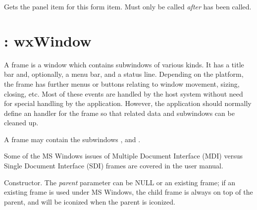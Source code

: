 \label{wxformitemgetitem}


Gets the panel item for this form item. Must only be called {\it after}\rtfsp
{} has been called.

\section{: wxWindow}\label{wxframe}

A frame is a window which contains subwindows of various kinds. It has a
title bar and, optionally, a menu bar, and a status line.  Depending on
the platform, the frame has further menus or buttons relating to window
movement, sizing, closing, etc. Most of these events are handled by the host
system without need for special handling by the application. However,
the application should normally define an  handler for the
frame so that related data and subwindows can be cleaned up.

A frame may contain the subwindows , \rtfsp
and .

Some of the MS Windows issues of Multiple Document Interface (MDI) versus
Single Document Interface (SDI) frames are covered in the user manual.


\label{constrframe}


Constructor.  The {\it parent} parameter can be NULL or an existing frame;
if an existing frame is used under MS Windows, the child frame is always on top
of the parent, and will be iconized when the parent is iconized.

